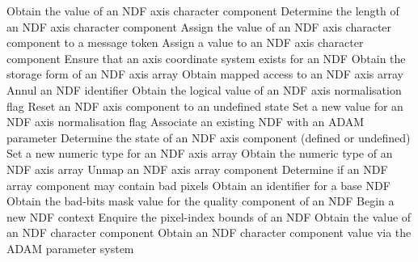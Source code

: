 \documentclass[twoside,11pt,nolof]{starlink}
\begin{document}
{\small
\begin{description}{\addtolength{\itemindent}{-8mm}}
            {Obtain the value of an NDF axis character component}
            {Determine the length of an NDF axis character component}
            {Assign the value of an NDF axis character component to a message token}
            {Assign a value to an NDF axis character component}
            {Ensure that an axis coordinate system exists for an NDF}
            {Obtain the storage form of an NDF axis array}
            {Obtain mapped access to an NDF axis array}
            {Annul an NDF identifier}
            {Obtain the logical value of an NDF axis normalisation flag}
            {Reset an NDF axis component to an undefined state}
            {Set a new value for an NDF axis normalisation flag}
            {Associate an existing NDF with an ADAM parameter}
            {Determine the state of an NDF axis component (defined or undefined)}
            {Set a new numeric type for an NDF axis array}
            {Obtain the numeric type of an NDF axis array}
            {Unmap an NDF axis array component}
            {Determine if an NDF array component may contain bad pixels}
            {Obtain an identifier for a base NDF}
            {Obtain the bad-bits mask value for the quality component of an NDF}
            {Begin a new NDF context}
            {Enquire the pixel-index bounds of an NDF}
            {Obtain the value of an NDF character component}
            {Obtain an NDF character component value via the ADAM parameter system}

\end{description}}
\end{document}
